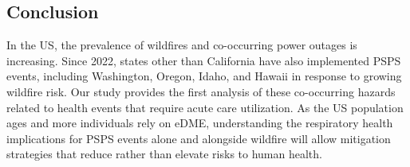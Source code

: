 \documentclass[../main.tex]{subfiles}
\begin{document}
\subsection{Conclusion}
In the US, the prevalence of wildfires and co-occurring power outages is increasing\citep{climatecentral2024weather, do2025spatiotemporal}. Since 2022, states other than California have also implemented PSPS events, including Washington, Oregon, Idaho, and Hawaii\citep{PSEHealthyEnergy_PSPS} in response to growing wildfire risk. Our study provides the first analysis of these co-occurring hazards related to health events that require acute care utilization. As the US population ages and more individuals rely on eDME, understanding the respiratory health implications for PSPS events alone and alongside wildfire \PM will allow mitigation strategies that reduce rather than elevate risks to human health.
\end{document}
